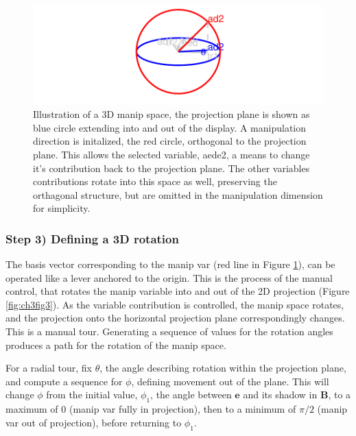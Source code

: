 \documentclass{template/monashthesis}
\begin{document}
\begin{figure}

{\centering \includegraphics[width=1\linewidth,]{./figures_from_script/ch3_fig2_manip_sp} 

}

\caption{Illustration of a 3D manip space, the projection plane is shown as blue circle extending into and out of the display. A manipulation direction is initalized, the red circle, orthogonal to the projection plane. This allows the selected variable, aede2, a means to change it's contribution back to the projection plane. The other variables contributions rotate into this space as well, preserving the orthagonal structure, but are omitted in the manipulation dimension for simplicity.}\label{fig:ch3fig2}
\end{figure}

\hypertarget{step-3-defining-a-3d-rotation}{%
\subsubsection{Step 3) Defining a 3D rotation}\label{step-3-defining-a-3d-rotation}}

The basis vector corresponding to the manip var (red line in Figure \ref{fig:ch3fig2}), can be operated like a lever anchored to the origin. This is the process of the manual control, that rotates the manip variable into and out of the 2D projection (Figure \ref{fig:ch3fig3}). As the variable contribution is controlled, the manip space rotates, and the projection onto the horizontal projection plane correspondingly changes. This is a manual tour. Generating a sequence of values for the rotation angles produces a path for the rotation of the manip space.

For a radial tour, fix \(\theta\), the angle describing rotation within the projection plane, and compute a sequence for \(\phi\), defining movement out of the plane. This will change \(\phi\) from the initial value, \(\phi_1\), the angle between \(\textbf{e}\) and its shadow in \(\textbf{B}\), to a maximum of \(0\) (manip var fully in projection), then to a minimum of \(\pi/2\) (manip var out of projection), before returning to \(\phi_1\).
\end{document}
